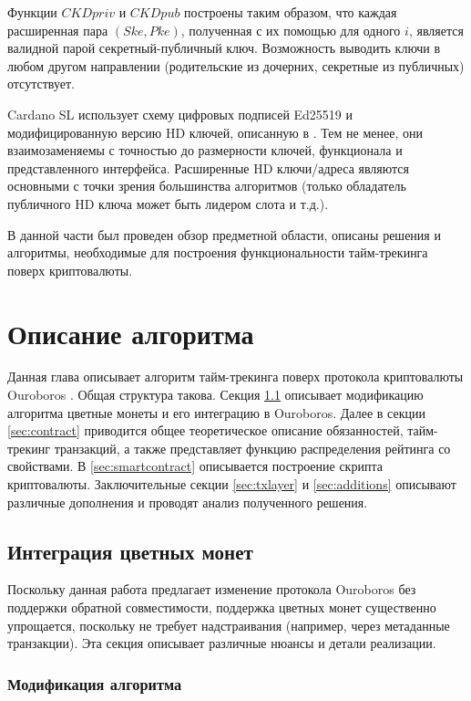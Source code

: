 \documentclass[specification,annotation]{itmo-student-thesis}
\begin{document}
Функции $CKDpriv$ и $CKDpub$ построены таким образом, что каждая
расширенная пара $(Ske,Pke)$, полученная с их помощью для одного $i$,
является валидной парой секретный-публичный ключ. Возможность выводить
ключи в любом другом направлении (родительские из дочерних, секретные
из публичных) отсутствует.

Cardano SL использует схему цифровых подписей Ed25519
\cite{bernstein2012high} и модифицированную версию HD ключей, описанную
в \cite{ed25519hd}. Тем не менее, они взаимозаменяемы с точностью до
размерности ключей, функционала и представленного
интерфейса. Расширенные HD ключи/адреса являются основными с точки
зрения большинства алгоритмов (только обладатель публичного HD ключа
может быть лидером слота и т.д.).

\chapterconclusion

В данной части был проведен обзор предметной области, описаны решения
и алгоритмы, необходимые для построения функциональности тайм-трекинга
поверх криптовалюты.

\chapter{Описание алгоритма}

Данная глава описывает алгоритм тайм-трекинга поверх протокола
криптовалюты Ouroboros \cite{ouroboros}. Общая структура
такова. Секция \ref{sec:colorcoins} описывает модификацию алгоритма
цветные монеты и его интеграцию в Ouroboros. Далее в секции
\ref{sec:contract} приводится общее теоретическое описание
обязанностей, тайм-трекинг транзакций, а также представляет функцию
распределения рейтинга со свойствами. В \ref{sec:smartcontract}
описывается построение скрипта криптовалюты. Заключительные секции
\ref{sec:txlayer} и \ref{sec:additions} описывают различные дополнения
и проводят анализ полученного решения.

\section{Интеграция цветных монет}
\label{sec:colorcoins}

Поскольку данная работа предлагает изменение протокола Ouroboros без
поддержки обратной совместимости, поддержка цветных монет существенно
упрощается, поскольку не требует надстраивания (например, через
метаданные транзакции). Эта секция описывает различные нюансы и детали
реализации.

\subsection{Модификация алгоритма}
\end{document}
